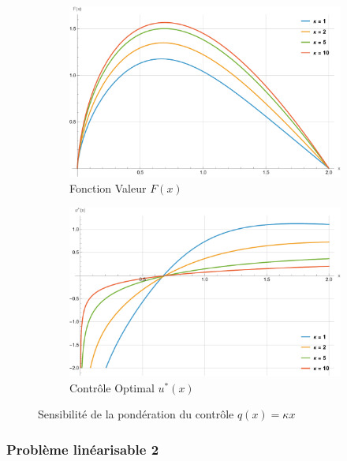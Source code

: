 \FloatBarrier\begin{figure}[htb]
    \centering
    \begin{subfigure}{0.49\linewidth}
        \includegraphics[width=\linewidth]{img/validation/P1/p1_K_value.pdf}
        \caption{Fonction Valeur $F(x)$}\label{fig:KappaValueVisualisation1}
    \end{subfigure}
    \hfill
    \begin{subfigure}{0.49\linewidth}
        \includegraphics[width=\linewidth]{img/validation/P1/p1_K_control.pdf}
        \caption{Contrôle Optimal $u^*(x)$}\label{fig:KappaControlVisualisation1}
    \end{subfigure}
    \caption{Sensibilité de la pondération du contrôle $q(x)=\kappa x$}\label{fig:KappaValueControlComparison1}
\end{figure}
\FloatBarrier\subsubsection{Problème linéarisable 2}\phantom{}\\
